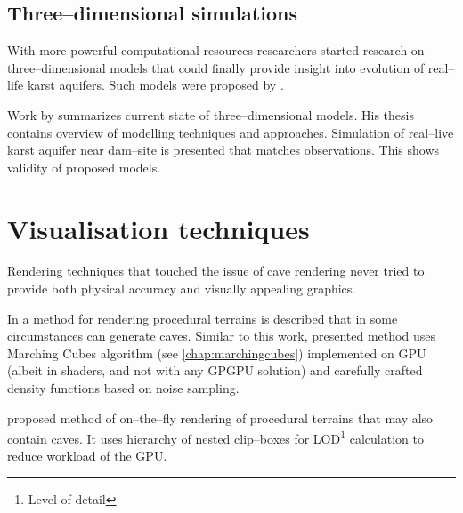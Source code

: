 \subsection{Three--dimensional simulations}

With more powerful computational resources researchers started research on
three--dimensional models that could finally provide insight into evolution
of real--life karst aquifers. Such models were proposed by
\cites{annable2003}{WRCR:WRCR9525}{Kaufmann2010241}.

Work by \cite{hiller2013} summarizes current state of three--dimensional models.
His thesis contains overview of modelling techniques and approaches. Simulation
of real--live karst aquifer near dam--site is presented that matches
observations. This shows validity of proposed models.

\section{Visualisation techniques}

Rendering techniques that touched the issue of cave rendering never tried to
provide both physical accuracy and visually appealing graphics.

In \cite{gpugems3ch01} a method for rendering procedural terrains is described
that in some circumstances can generate caves. Similar to this work, presented
method uses Marching Cubes algorithm (see \autoref{chap:marchingcubes})
implemented on GPU (albeit in shaders, and not with any GPGPU solution) and
carefully crafted density functions based on noise sampling.

\Cite{forstmann2005} proposed method of on--the--fly rendering of procedural
terrains that may also contain caves. It uses hierarchy of nested clip--boxes
for LOD\footnote{Level of detail} calculation to reduce workload of the GPU.
